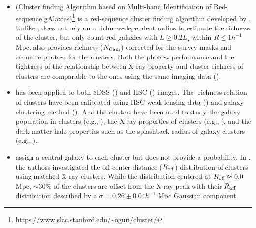 \documentclass[fleqn,usenatbib,useAMS,english]{mnras}
\begin{document}
    \begin{itemize}

        \item \camira{} (Cluster finding Algorithm based on Multi-band Identification of
            Red-sequence gAlaxies)\footnote{\url{https://www.slac.stanford.edu/~oguri/cluster/}}
            is a red-sequence cluster finding algorithm developed by \citet{Oguri2014}.
            Unlike \redm{}, \camira{} does not rely on a richness-dependent radius to
            estimate the richness of the cluster, but only count red galaxies
            with $L \geq 0.2L_{\star}$ within $R \leq 1 h^{-1}$ Mpc.
            \camira{} also provides richness ($N_{\rm Cam}$) corrected for the survey masks
            and accurate photo-$z$ for the clusters.
            Both the photo-$z$ performance and the tightness of the relationship between
            X-ray property and cluster richness of \camira{} clusters are comparable to
            the \redm{} ones using the same imaging data (\citealt{Oguri2014}).

        \item \camira{} has been applied to both SDSS (\citealt{Oguri2014}) and HSC
            (\citealt{Oguri2018}) images.
            The \mvir{}-richness relation of \camira{} clusters have been calibrated using
            HSC weak lensing data (\citealt{Murata2019, Chiu2020a}) and galaxy
            clustering method (\citealt{Chiu2020b}).
            And the \camira{} clusters have been used to study the galaxy population in
            clusters (e.g., \addref{}), the X-ray properties of clusters (e.g., \addref{}),
            and the dark matter halo properties such as the splashback radius
            of galaxy clusters (e.g., \addref{}).

        \item \camira{} assign a central galaxy to each cluster but does not provide
            a probability.
            In \citet{Oguri2018}, the authors investigated the off-center distance ($R_{\rm
            off}$) distribution of \camira{} clusters using matched X-ray clusters.
            While the distribution centered at $R_{\rm off} \approx 0.0$ Mpc, $\sim 30$\%
            of the clusters are offset from the X-ray peak with their $R_{\rm off}$ distribution
            described by a $\sigma=0.26 \pm 0.04 h^{-1}$ Mpc Gaussian component.


\end{itemize}
\end{document}
